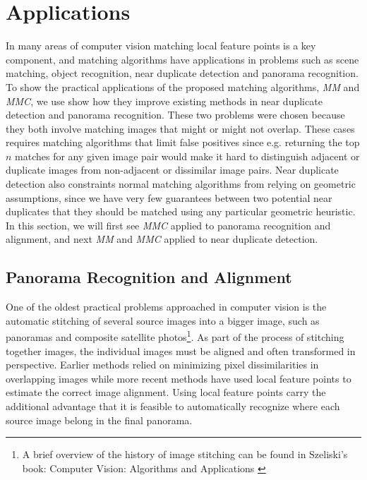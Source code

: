 \documentclass{article}
\begin{document}
\section{Applications}

In many areas of computer vision matching local feature points is a key 
component, and matching algorithms have applications in problems such as
scene matching, object recognition, near duplicate detection and 
panorama recognition. To show the practical applications of the proposed 
matching algorithms, \emph{MM} and \emph{MMC}, we use show how they 
improve existing methods in near duplicate detection and panorama 
recognition. These two problems were chosen because they both involve 
matching images that might or might not overlap. These cases requires 
matching algorithms that limit false positives since e.g. returning the 
top $n$ matches for any given image pair would make it hard to 
distinguish adjacent or duplicate images from non-adjacent or dissimilar
image pairs. Near duplicate detection also constraints normal matching 
algorithms from relying on geometric assumptions, since we have very few
guarantees between two potential near duplicates that they should be 
matched using any particular geometric heuristic. In this section, we 
will first see \emph{MMC} applied to panorama recognition and alignment,
and next \emph{MM} and \emph{MMC} applied to near duplicate detection.


\subsection{Panorama Recognition and Alignment}
One of the oldest practical problems approached in computer vision is 
the automatic stitching of several source images into a bigger image, 
such as panoramas and composite satellite photos\footnote{A brief 
overview of the history of image stitching can be found in Szeliski's 
book: Computer Vision: Algorithms and Applications \cite{szeliski2010}}.  
As part of the process of stitching together images, the individual 
images must be aligned and often transformed in perspective. Earlier 
methods relied on minimizing pixel dissimilarities in overlapping images 
while more recent methods have used local feature points to estimate the 
correct image alignment. Using local feature points carry the additional 
advantage that it is feasible to automatically recognize where each 
source image belong in the final panorama.
\end{document}
